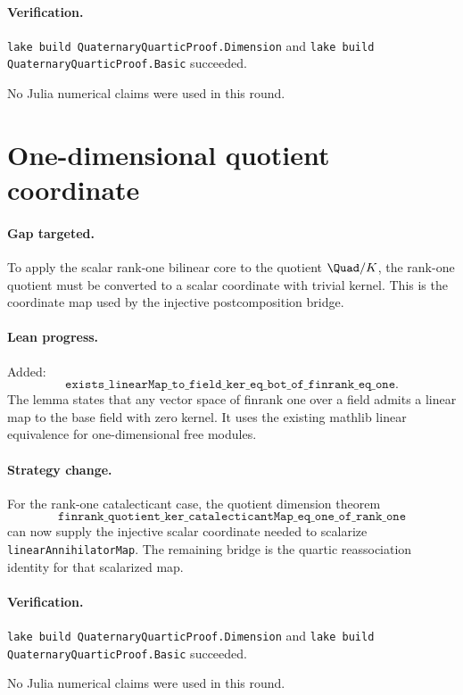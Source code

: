 \documentclass[11pt]{article}
\begin{document}
\paragraph{Verification.}
\texttt{lake build QuaternaryQuarticProof.Dimension} and
\texttt{lake build QuaternaryQuarticProof.Basic} succeeded.

No Julia numerical claims were used in this round.

\section*{One-dimensional quotient coordinate}

\paragraph{Gap targeted.}
To apply the scalar rank-one bilinear core to the quotient
\(\Quad/K\), the rank-one quotient must be converted to a scalar coordinate
with trivial kernel.  This is the coordinate map used by the injective
postcomposition bridge.

\paragraph{Lean progress.}
Added:
\[
\texttt{exists\_linearMap\_to\_field\_ker\_eq\_bot\_of\_finrank\_eq\_one}.
\]
The lemma states that any vector space of finrank one over a field admits a
linear map to the base field with zero kernel.  It uses the existing mathlib
linear equivalence for one-dimensional free modules.

\paragraph{Strategy change.}
For the rank-one catalecticant case, the quotient dimension theorem
\[
\texttt{finrank\_quotient\_ker\_catalecticantMap\_eq\_one\_of\_rank\_one}
\]
can now supply the injective scalar coordinate needed to scalarize
\texttt{linearAnnihilatorMap}.  The remaining bridge is the quartic
reassociation identity for that scalarized map.

\paragraph{Verification.}
\texttt{lake build QuaternaryQuarticProof.Dimension} and
\texttt{lake build QuaternaryQuarticProof.Basic} succeeded.

No Julia numerical claims were used in this round.
\end{document}
